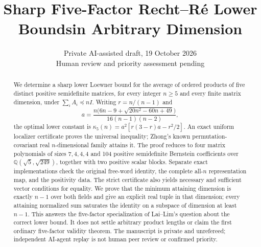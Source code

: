 \documentclass[11pt]{article}
\title{Sharp Five-Factor Recht--R\'e Lower Bounds\newline in Arbitrary Dimension}
\author{}
\date{Private AI-assisted draft, 19 October 2026\\Human review and priority assessment pending}
\newcommand{\Q}{\mathbb Q}
\begin{document}
\maketitle
\begin{abstract}
We determine a sharp lower Loewner bound for the average of ordered
products of five distinct positive semidefinite matrices, for every integer
$n\ge5$ and every finite matrix dimension, under $\sum_iA_i\preceq nI$.
Writing $r=n/(n-1)$ and
\[
 a=\frac{n\bigl(6n-9+\sqrt{20n^2-60n+49}\bigr)}{16(n-1)(n-2)},
\]
the optimal lower constant is
$\kappa_5(n)=a^2[r(3-r)a-r^2/2]$.
An exact uniform localizer certificate proves the universal inequality;
Zhong's known permutation-covariant real $n$-dimensional family attains it.
The proof reduces to four matrix polynomials of sizes $7,4,4,4$ and
104 positive semidefinite Bernstein coefficients over
$\Q(\sqrt5,\sqrt{249})$, together with two positive scalar blocks.
Separate exact implementations check the original free-word identity,
the complete all-$n$ representation map, and the positivity data.
The strict certificate also yields necessary and sufficient vector
conditions for equality. We prove that the minimum attaining dimension
is exactly $n-1$ over both fields and give an explicit real tuple in that
dimension; every attaining normalized sum saturates the identity on a subspace of
dimension at least $n-1$.
This answers the five-factor specialization of Lai--Lim's question about
the correct lower bound. It does not settle arbitrary product lengths or
claim the first ordinary five-factor validity theorem.
The manuscript is private and unrefereed; independent AI-agent replay is
not human peer review or confirmed priority.
\end{abstract}
\end{document}
